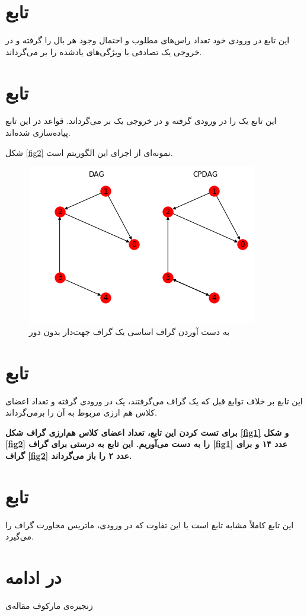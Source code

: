 \documentclass{article}
\begin{document}
\section{تابع
}
این تابع در ورودی خود تعداد راس‌های مطلوب و احتمال وجود هر بال را گرفته و در خروجی یک 
تصادفی با ویژگی‌های یادشده را  بر می‌گرداند. 
\section{تابع
}
این تابع یک 
را در ورودی گرفته و در خروجی یک 
بر می‌گرداند. قواعد 
در این تابع پیاده‌سازی شده‌اند.

شکل 
\eqref{fig2}
نمونه‌ای از اجرای این الگوریتم است.
\begin{figure}[h!]
	\includegraphics[scale=0.6]{meek.png}
	\caption{به دست آوردن گراف اساسی یک گراف جهت‌دار بدون دور}
	\label{fig2}
\end{figure}

\section{تابع 
}
این تابع بر خلاف توابع قبل که یک گراف 
می‌گرفتند، یک 
در ورودی گرفته و تعداد اعضای کلاس هم ارزی مربوط به آن را برمی‌گرداند. 

\textbf{
برای تست کردن این تابع، تعداد اعضای کلاس هم‌ارزی گراف شکل \eqref{fig1} و شکل \eqref{fig2} را به دست می‌آوریم. این تابع به درستی برای گراف \eqref{fig1} عدد ۱۴  و برای گراف \eqref{fig2} عدد ۲ را باز می‌گرداند.}

\section{تابع 
}
این تابع کاملاً مشابه تابع 
است با این تفاوت که در ورودی، ماتریس مجاورت گراف را می‌گیرد.

\section{در ادامه}
زنجیره‌ی مارکوف مقاله‌ی 
\cite{mcmc}
\newpage


\end{document}
